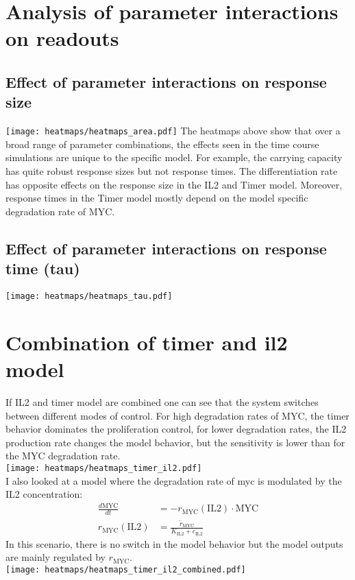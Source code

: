 \documentclass[12pt,a4paper]{article}
\begin{document}
\section*{Analysis of parameter interactions on readouts}
\subsection*{Effect of parameter interactions on response size}
\texttt{[image: heatmaps/heatmaps\_area.pdf]}
The heatmaps above show that over a broad range of parameter combinations, the effects seen in the time course simulations are unique to the specific model. For example, the carrying capacity has quite robust response sizes but not response times. The differentiation rate has opposite effects on the response size in the IL2 and Timer model. Moreover, response times in the Timer model mostly depend on the model specific degradation rate of MYC.
\newpage

\subsection*{Effect of parameter interactions on response time (tau)}
\texttt{[image: heatmaps/heatmaps\_tau.pdf]}
\newpage

\section*{Combination of timer and il2 model}
If IL2 and timer model are combined one can see that the system switches between different modes of control. For high degradation rates of MYC, the timer behavior dominates the proliferation control, for lower degradation rates, the IL2 production rate changes the model behavior, but the sensitivity is lower than for the MYC degradation rate.\\
\texttt{[image: heatmaps/heatmaps\_timer\_il2.pdf]}\\
I also looked at a model where the degradation rate of myc is modulated by the IL2 concentration:
\begin{align*}
\frac{d\text{MYC}}{dt} &= -r_\text{MYC}(\text{IL2}) \cdot \text{MYC} \\
r_\text{MYC}(\text{IL2}) &= \frac{\widetilde{r}_\text{MYC}}{K_\text{IL2}+c_\text{IL2}}
\end{align*}
In this scenario, there is no switch in the model behavior but the model outputs are mainly regulated by $r_\text{MYC}$.\\
\texttt{[image: heatmaps/heatmaps\_timer\_il2\_combined.pdf]}
\newpage
\end{document}
